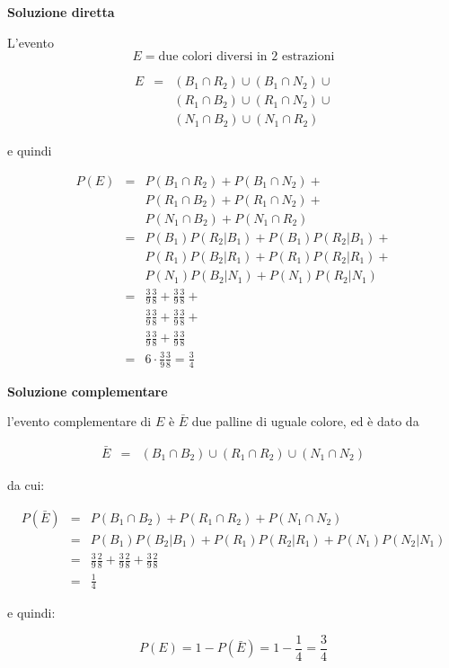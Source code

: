 \documentclass[
  11pt,
]{book}
\theoremstyle{mytheoremstyle}
\theoremstyle{mydefstyle}
\newenvironment{sol}
  {
  \begin{tcolorbox}[enhanced,breakable,arc=0.1mm,boxrule=1pt,colback=white,colframe=iblue,
  title=\bf \fontfamily{lmss}\selectfont \hspace{.5 cm} Soluzione,drop fuzzy shadow]

}{
\end{tcolorbox}
  }
\begin{document}
\begin{sol}
\textbf{Soluzione diretta}

L'evento
\[E=\text{due colori diversi in 2 estrazioni}\]

\begin{eqnarray*}
E&=& (B_1\cap R_2)\cup(B_1\cap N_2)\cup\\
& &(R_1\cap B_2)\cup (R_1\cap N_2)\cup\\
& &(N_1\cap B_2)\cup (N_1\cap R_2)
\end{eqnarray*}

e quindi

\begin{eqnarray*}
P(E)&=& P(B_1\cap R_2)+P(B_1\cap N_2)+\\
    & & P(R_1\cap B_2)+ P(R_1\cap N_2)+\\
    & & P(N_1\cap B_2)+ P(N_1\cap R_2)\\
    &=& P(B_1)P(R_2|B_1)+P(B_1)P(R_2|B_1)+\\
    & & P(R_1)P(B_2|R_1)+P(R_1)P(R_2|R_1)+\\
    & & P(N_1)P(B_2|N_1)+P(N_1)P(R_2|N_1)\\
    &=& \frac 39\frac 38+ \frac 39\frac 38+\\
    & & \frac 39\frac 38+ \frac 39\frac 38+\\
    & & \frac 39\frac 38+ \frac 39\frac 38\\
&=& 6\cdot \frac 39\frac 38 = \frac 34 
\end{eqnarray*}

\textbf{Soluzione complementare}

l'evento complementare di \(E\) è \(\bar E\) due palline di uguale colore, ed è dato da

\begin{eqnarray*}
\bar E&=& (B_1\cap B_2)\cup(R_1\cap R_2)\cup (N_1\cap N_2)
\end{eqnarray*}

da cui:

\begin{eqnarray*}
P(\bar E)&=& P(B_1\cap B_2)+P(R_1\cap R_2)+P(N_1\cap N_2)\\
&=& P(B_1)P(B_2|B_1)+P(R_1)P(R_2|R_1)+P(N_1)P(N_2|N_1)\\
&=& \frac 39\frac 28 + \frac 39\frac 28 + \frac 39\frac 28 \\
&=& \frac 14
\end{eqnarray*}

e quindi:

\[
P(E)=1-P(\bar E)=1- \frac 14=\frac 34
\]

\end{sol}
\end{document}
